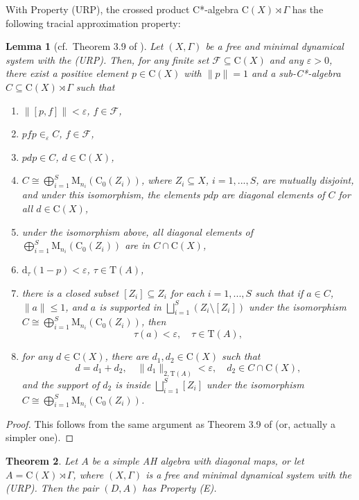\documentclass[12pt, oneside, psamsfonts]{amsart}
\newtheorem{thm}{Theorem}[section]
\newtheorem{lem}[thm]{Lemma}
\theoremstyle{definition}
\theoremstyle{remark}
\numberwithin{equation}{section}
\newcommand{\norm}[1]{\| #1\|}
\newcommand{\eps}{\varepsilon}
\newcommand{\tr}{\mathrm{T}}
\begin{document}
With Property (URP), the crossed product C*-algebra $\mathrm{C}(X) \rtimes \Gamma$ has the following tracial approximation property:
\begin{lem}[cf.~Theorem 3.9 of \cite{Niu-MD-Z}]\label{pre-approx}
Let $(X, \Gamma)$ be a free and minimal dynamical system with the (URP). Then, for any finite set $ \mathcal F \subseteq \mathrm{C}(X)$ and any $\eps>0$, there exist a positive element $p \in \mathrm{C}(X)$ with $\norm{p} = 1$ and a sub-C*-algebra $C \subseteq \mathrm{C}(X) \rtimes\Gamma$ such that
\begin{enumerate}
\item $ \norm{ [p, f] } < \eps$, $ f \in \mathcal F$,
\item $pfp \in_\eps C $, $f \in \mathcal F$, 
\item $pdp \in C$, $d \in \mathrm{C}(X)$,  
\item $C \cong \bigoplus_{i=1}^S \mathrm{M}_{n_i}(\mathrm{C}_0(Z_i))$, where $Z_i \subseteq X$, $i=1, ..., S$, are mutually disjoint, and under this isomorphism, the elements $pdp$ are  diagonal elements of $C$ for all $d \in \mathrm{C}(X)$,
\item under the isomorphism above, all diagonal elements of $\bigoplus_{i=1}^S \mathrm{M}_{n_i}(\mathrm{C}_0(Z_i))$ are in $C \cap \mathrm{C}(X)$,
\item $\mathrm{d}_\tau(1-p) < \eps$, $\tau \in \tr(A)$, 
\item there is a closed subset $[Z_{i}] \subseteq Z_i$ for each $i=1, ..., S$ such that if $a \in C$, $\norm{a} \leq 1$, and $a$ is supported in $\bigsqcup_{i=1}^S (Z_i \setminus [Z_{i}])$ under the isomorphism $C \cong \bigoplus_{i=1}^S\mathrm{M}_{n_i}(\mathrm{C}_0(Z_i))$, then $$ \tau(a) < \eps, \quad \tau \in \tr(A),$$
\item for any $d \in \mathrm{C}(X)$, there are $d_1, d_2 \in \mathrm{C}(X)$ such that  $$d = d_1 + d_2,\quad \norm{d_1}_{2, \tr(A)} < \eps,\quad d_2 \in C \cap \mathrm{C}(X), $$ and the support of $d_2$ is inside $\bigsqcup_{i=1}^S [Z_i]$ under the isomorphism $C \cong \bigoplus_{i=1}^S \mathrm{M}_{n_i}(\mathrm{C}_0(Z_i))$.
\end{enumerate}
\end{lem}
\begin{proof}
This follows from the same argument as Theorem 3.9 of \cite{Niu-MD-Z} (or, actually a simpler one).
\end{proof}


\begin{thm}\label{Property-D}
Let $A$ be a simple AH algebra with diagonal maps, or let $A = \mathrm{C}(X) \rtimes \Gamma$, where $(X, \Gamma)$ is a free and minimal dynamical system with the (URP). Then the pair $(D, A)$ has Property (E).
\end{thm}
\end{document}
